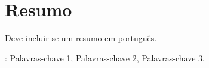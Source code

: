\pagestyle{MyThesisStyle}
\chapter*{Resumo}\label{resumo}



Deve incluir-se um resumo em português.

\vfill
{}: Palavras-chave 1, Palavras-chave 2, Palavras-chave 3.
